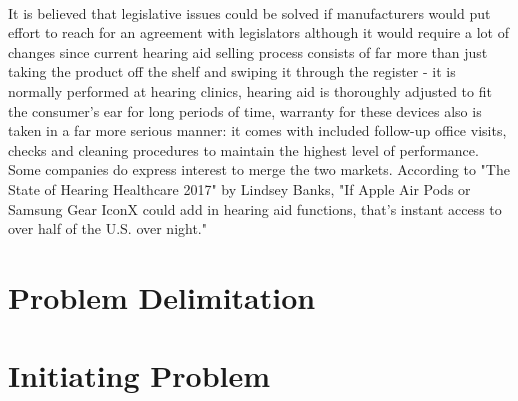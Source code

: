 \paragraph{}
It is believed that legislative issues could be solved if manufacturers would put effort to reach for an agreement with legislators although it would require a lot of changes since current hearing aid selling process consists of far more than just taking the product off the shelf and swiping it through the register - it is normally performed at hearing clinics, hearing aid is thoroughly adjusted to fit the consumer's ear for long periods of time, warranty for these devices also is taken in a far more serious manner: it comes with included follow-up office visits, checks and cleaning procedures to maintain the highest level of performance. Some companies do express interest to merge the two markets. According to "The State of Hearing Healthcare 2017" by Lindsey Banks, "If Apple Air Pods or Samsung Gear IconX could add in hearing aid functions, that’s instant access to over half of the U.S. over night."  
\paragraph{}


   
\section{Problem Delimitation}
\section{Initiating Problem}


